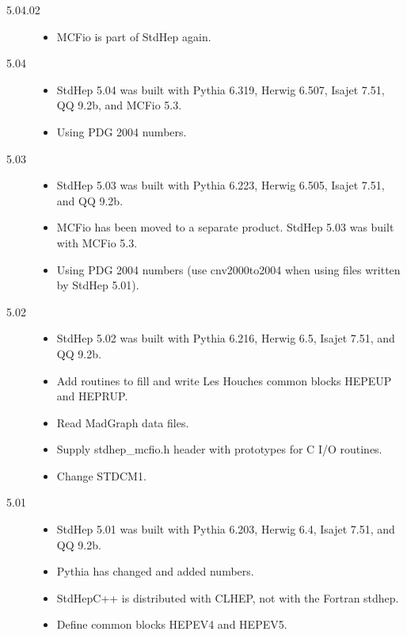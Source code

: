 \begin{description}
\item[5.04.02]
\begin{itemize}
\item MCFio is part of StdHep again.
\end{itemize}

\item[5.04]

\begin{itemize}
\item StdHep 5.04 was built with Pythia 6.319, Herwig 6.507,
      Isajet 7.51, QQ 9.2b, and MCFio 5.3.
\item Using PDG 2004 numbers.
\end{itemize}

\item[5.03]

\begin{itemize}
\item StdHep 5.03 was built with Pythia 6.223, Herwig 6.505, Isajet 7.51, and QQ 9.2b.
\item MCFio has been moved to a separate product.
      StdHep 5.03 was built with MCFio 5.3.
\item Using PDG 2004 numbers
      (use cnv2000to2004 when using files written by StdHep 5.01).
\end{itemize}

\item[5.02]

\begin{itemize}
\item StdHep 5.02 was built with Pythia 6.216, Herwig 6.5, Isajet 7.51, and QQ 9.2b.
\item Add routines to fill and write Les Houches common blocks HEPEUP and HEPRUP.
\item Read MadGraph data files.
\item Supply stdhep\_mcfio.h header with prototypes for C I/O routines.
\item Change STDCM1.
\end{itemize}

\item[5.01]

\begin{itemize}
\item StdHep 5.01 was built with Pythia 6.203, Herwig 6.4, Isajet 7.51, and QQ 9.2b.
\item Pythia has changed and added numbers.
\item StdHepC++ is distributed with CLHEP, not with the Fortran stdhep.
\item Define common blocks HEPEV4 and HEPEV5.
\end{itemize}



\end{description}
